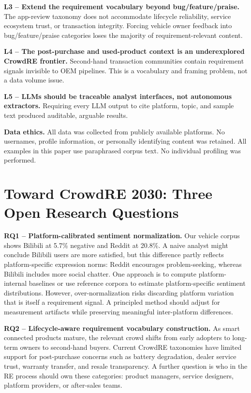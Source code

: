 \documentclass[conference]{IEEEtran}
\begin{document}
\textbf{L3 -- Extend the requirement vocabulary beyond bug/feature/praise.} The app-review taxonomy does not accommodate lifecycle reliability, service ecosystem trust, or transaction integrity. Forcing vehicle owner feedback into bug/feature/praise categories loses the majority of requirement-relevant content.

\textbf{L4 -- The post-purchase and used-product context is an underexplored CrowdRE frontier.} Second-hand transaction communities contain requirement signals invisible to OEM pipelines. This is a vocabulary and framing problem, not a data volume issue.

\textbf{L5 -- LLMs should be traceable analyst interfaces, not autonomous extractors.} Requiring every LLM output to cite platform, topic, and sample text produced auditable, arguable results.

\textbf{Data ethics.} All data was collected from publicly available platforms. No usernames, profile information, or personally identifying content was retained. All examples in this paper use paraphrased corpus text. No individual profiling was performed.

\section{Toward CrowdRE 2030: Three Open Research Questions}

\textbf{RQ1 -- Platform-calibrated sentiment normalization.} Our vehicle corpus shows Bilibili at 5.7\% negative and Reddit at 20.8\%. A naive analyst might conclude Bilibili users are more satisfied, but this difference partly reflects platform-specific expression norms: Reddit encourages problem-seeking, whereas Bilibili includes more social chatter. One approach is to compute platform-internal baselines or use reference corpora to estimate platform-specific sentiment distributions. However, over-normalization risks discarding platform variation that is itself a requirement signal. A principled method should adjust for measurement artifacts while preserving meaningful inter-platform differences.

\textbf{RQ2 -- Lifecycle-aware requirement vocabulary construction.} As smart connected products mature, the relevant crowd shifts from early adopters to long-term owners to second-hand buyers. Current CrowdRE taxonomies have limited support for post-purchase concerns such as battery degradation, dealer service trust, warranty transfer, and resale transparency. A further question is who in the RE process should own these categories: product managers, service designers, platform providers, or after-sales teams.
\end{document}
